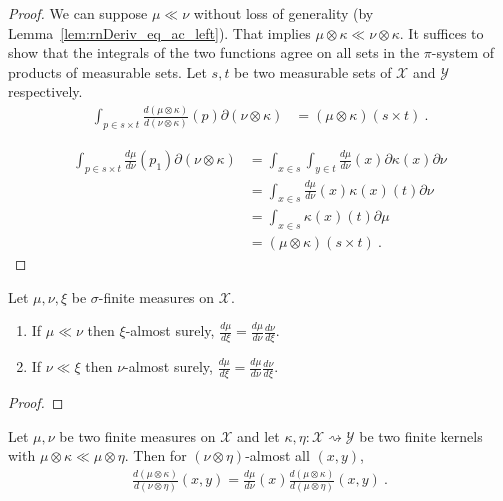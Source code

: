 \begin{proof} \leanok
{}
We can suppose $\mu \ll \nu$ without loss of generality (by Lemma~\ref{lem:rnDeriv_eq_ac_left}).
That implies $\mu \otimes \kappa \ll \nu \otimes \kappa$.
It suffices to show that the integrals of the two functions agree on all sets in the $\pi$-system of products of measurable sets. Let $s, t$ be two measurable sets of $\mathcal X$ and $\mathcal Y$ respectively.
\begin{align*}
\int_{p \in s \times t} \frac{d (\mu \otimes \kappa)}{d (\nu \otimes \kappa)}(p) \partial(\nu \otimes \kappa)
&= (\mu \otimes \kappa) (s \times t)
\: .
\end{align*}

\begin{align*}
\int_{p \in s \times t} \frac{d \mu}{d \nu}(p_1) \partial(\nu \otimes \kappa)
&= \int_{x \in s} \int_{y \in t} \frac{d \mu}{d \nu}(x) \partial \kappa(x) \partial \nu
\\
&= \int_{x \in s} \frac{d \mu}{d \nu}(x) \kappa(x)(t) \partial \nu
\\
&= \int_{x \in s} \kappa(x)(t) \partial \mu
\\
&= (\mu \otimes \kappa) (s \times t)
\: .
\end{align*}
\end{proof}


\begin{lemma}
  \label{lem:rnDeriv_chain}
  \mathlibok
  \uses{}
  Let $\mu, \nu, \xi$ be $\sigma$-finite measures on $\mathcal X$.
  \begin{enumerate}
    \item If $\mu \ll \nu$ then $\xi$-almost surely, $\frac{d \mu}{d \xi} = \frac{d \mu}{d \nu} \frac{d \nu}{d \xi}$.
    \item If $\nu \ll \xi$ then $\nu$-almost surely, $\frac{d \mu}{d \xi} = \frac{d \mu}{d \nu} \frac{d \nu}{d \xi}$.
  \end{enumerate}
\end{lemma}

\begin{proof}\mathlibok
\uses{}
\end{proof}


\begin{theorem}
  \label{thm:rnDeriv_chain_compProd}
  \leanok
  \uses{}
  Let $\mu, \nu$ be two finite measures on $\mathcal X$ and let $\kappa, \eta : \mathcal X \rightsquigarrow \mathcal Y$ be two finite kernels with $\mu \otimes \kappa \ll \mu \otimes \eta$. Then for $(\nu \otimes \eta)$-almost all $(x,y)$,
  \begin{align*}
  \frac{d(\mu \otimes \kappa)}{d(\nu \otimes \eta)}(x, y)
  = \frac{d \mu}{d \nu}(x) \frac{d(\mu \otimes \kappa)}{d(\mu \otimes \eta)}(x, y)
  \: .
  \end{align*}
\end{theorem}

